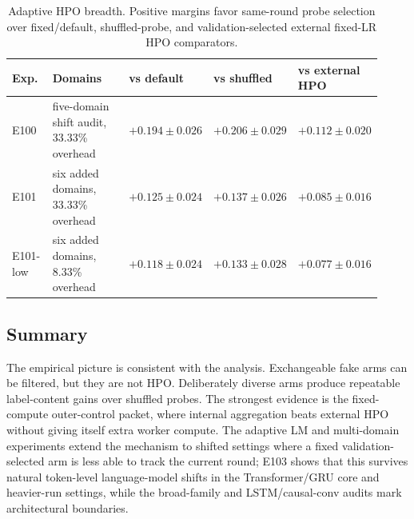 \begin{table}[t]
\centering
\small
\caption{Adaptive HPO breadth. Positive margins favor same-round probe
selection over fixed/default, shuffled-probe, and validation-selected external
fixed-LR HPO comparators.}
\label{tab:multidomain}
\begin{tabular}{@{}p{0.12\linewidth}p{0.34\linewidth}p{0.16\linewidth}p{0.16\linewidth}p{0.14\linewidth}@{}}
\toprule
Exp. & Domains & vs default & vs shuffled & vs external HPO \\
\midrule
E100 & five-domain shift audit, 33.33\% overhead & $+0.194 \pm 0.026$ & $+0.206 \pm 0.029$ & $+0.112 \pm 0.020$ \\
E101 & six added domains, 33.33\% overhead & $+0.125 \pm 0.024$ & $+0.137 \pm 0.026$ & $+0.085 \pm 0.016$ \\
E101-low & six added domains, 8.33\% overhead & $+0.118 \pm 0.024$ & $+0.133 \pm 0.028$ & $+0.077 \pm 0.016$ \\
\bottomrule
\end{tabular}
\end{table}

\subsection{Summary}

The empirical picture is consistent with the analysis. Exchangeable fake arms
can be filtered, but they are not HPO. Deliberately diverse arms produce
repeatable label-content gains over shuffled probes. The strongest evidence is
the fixed-compute outer-control packet, where internal aggregation beats
external HPO without giving itself extra worker compute. The adaptive LM and
multi-domain experiments extend the mechanism to shifted settings where a
fixed validation-selected arm is less able to track the current round; E103
shows that this survives natural token-level language-model shifts in the
Transformer/GRU core and heavier-run settings, while the broad-family and
LSTM/causal-conv audits mark architectural boundaries.
